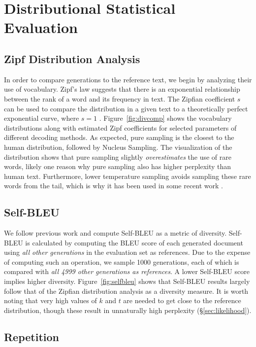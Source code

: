  \section{Distributional Statistical Evaluation}
\label{sec:dist}

\subsection{Zipf Distribution Analysis} In order to compare generations to the reference text, we begin by analyzing their use of vocabulary. Zipf's law suggests that there is an exponential relationship between the rank of a word and its frequency in text. The Zipfian coefficient $s$ can be used to compare the distribution in a given text to a theoretically perfect exponential curve, where $s=1$ \citep{piantadosi2014zipf}. Figure~\ref{fig:divcomp} shows the vocabulary distributions along with estimated Zipf coefficients for selected parameters of different decoding methods. As expected, pure sampling is the closest to the human distribution, followed by Nucleus Sampling. The visualization of the distribution shows that pure sampling slightly \emph{overestimates} the use of rare words, likely one reason why pure sampling also has higher perplexity than human text. Furthermore, lower temperature sampling avoids sampling these rare words from the tail,  which is why it has been used in some recent work \citep{fan2018hierarchical,radford2019BetterLMs}.

\subsection{Self-BLEU}

We follow previous work and compute Self-BLEU \citep{zhu2018texygen} as a metric of diversity. Self-BLEU is calculated by computing the BLEU score of each generated document using \emph{all other generations} in the evaluation set as references. Due to the expense of computing such an operation, we sample 1000 generations, each of which is compared with \emph{all 4999 other generations as references}. A lower Self-BLEU score implies higher diversity. Figure~\ref{fig:selfbleu} shows that Self-BLEU results largely follow that of the Zipfian distribution analysis as a diversity measure. It is worth noting that very high values of $k$ and $t$ are needed to get close to the reference distribution, though these result in unnaturally high perplexity (\S\ref{sec:likelihood}).

\subsection{Repetition}

